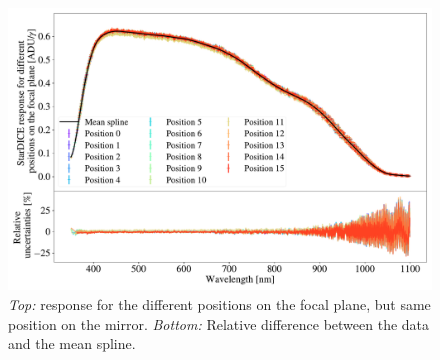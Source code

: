 \begin{figure}[h]
    \centering
    \includegraphics[width=\columnwidth]{fig/ccd_positions.pdf}
    \caption{\textit{Top:} \SD response for the different positions on the focal plane, but same position on the mirror. \textit{Bottom:} Relative difference between the data and the mean spline.}
    \label{fig:ccd_positions}
\end{figure}







